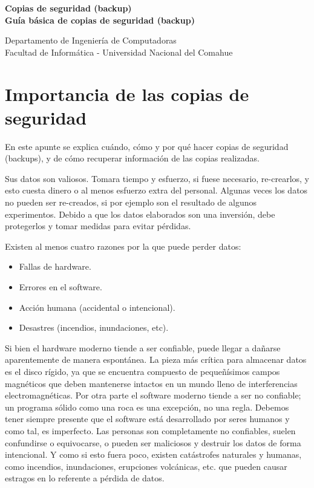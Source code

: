 \documentclass[12pt]{article}
\def\maketitle{

 \makeatletter
 {\color{bl} \centering \huge \sc \textbf{
 Copias de seguridad (backup)\\ 
\large \vspace*{-8pt} \color{black} Guía básica de copias de seguridad (backup)
 \vspace*{8pt} }\par}
 \makeatother


 \makeatletter
 {\centering \small 
 	Departamento de Ingeniería de Computadoras \\
 	Facultad de Informática - Universidad Nacional del Comahue \\
 	\vspace{20pt} }
 \makeatother

}
\begin{document}
\thispagestyle{empty}
\maketitle
\setlength{\parindent}{0pt}


\section*{Importancia de las copias de seguridad}
 En este apunte se explica cuándo, cómo y  por qué hacer copias de 
seguridad (backups), y de cómo recuperar información de las 
copias realizadas.

Sus datos son valiosos. Tomara tiempo y esfuerzo, si fuese necesario,
re-crearlos, y esto cuesta dinero o al menos esfuerzo extra del personal.
Algunas veces los datos no pueden ser re-creados, si por ejemplo son el 
resultado de algunos experimentos. Debido a que los datos elaborados son una 
inversión, debe protegerlos y tomar medidas para evitar pérdidas.

Existen al menos cuatro razones por la que puede perder datos: 
\begin{itemize}
\item Fallas de hardware.
\item Errores en el software. 
\item Acción humana (accidental o intencional). 
\item Desastres (incendios, inundaciones, etc). 
\end{itemize}

Si bien el hardware moderno tiende a ser confiable, puede llegar a dañarse
aparentemente de manera espontánea. La pieza más crítica para 
almacenar datos es el disco rígido, ya que se encuentra compuesto de 
pequeñísimos campos magnéticos que deben mantenerse intactos en un mundo 
lleno de interferencias electromagnéticas.  
Por otra parte el software moderno tiende a ser no confiable; un programa 
sólido como una roca es una excepción, no una regla. Debemos tener siempre
presente que el software está desarrollado por seres humanos y como tal, es
imperfecto. Las personas son completamente no confiables, suelen confundirse
o equivocarse, o pueden ser maliciosos y destruir los datos de forma 
intencional. Y como si esto fuera poco, existen catástrofes naturales y
humanas, como incendios, inundaciones, erupciones volcánicas, etc. 
que pueden causar estragos en lo referente a pérdida de datos.  

\end{document}
